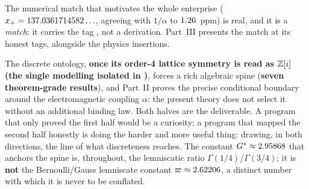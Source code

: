  The numerical match that
motivates the whole enterprise ($x_+ = 137.0361714582\ldots$, agreeing with
$1/\alpha$ to $1.26$~ppm) is real, and it is a \emph{match}: it
carries the tag , not a derivation. Part~III presents the
match at its honest tags, alongside the  physics insertions.

 The discrete ontology,
\textbf{once its order-4 lattice symmetry is read as $\mathbb{Z}[i]$ (the single modelling
 isolated in )}, forces a rich algebraic
spine (\textbf{seven theorem-grade results}), and Part~II proves the precise
conditional boundary around the electromagnetic coupling $\alpha$: the present
theory does not select it without an additional binding law. Both halves are the
deliverable. A program that only proved the
first half would be a curiosity; a program that mapped the second half honestly
is doing the harder and more useful thing: drawing, in both directions, the
line of what discreteness reaches. The constant $G^{*}\approx2.95868$ that
anchors the spine is, throughout, the lemniscatic ratio $\Gamma(1/4)/\Gamma(3/4)$;
it is \textbf{not} the Bernoulli/Gauss lemniscate constant
$\varpi\approx2.62206$, a distinct number with which it is never to be
conflated.
